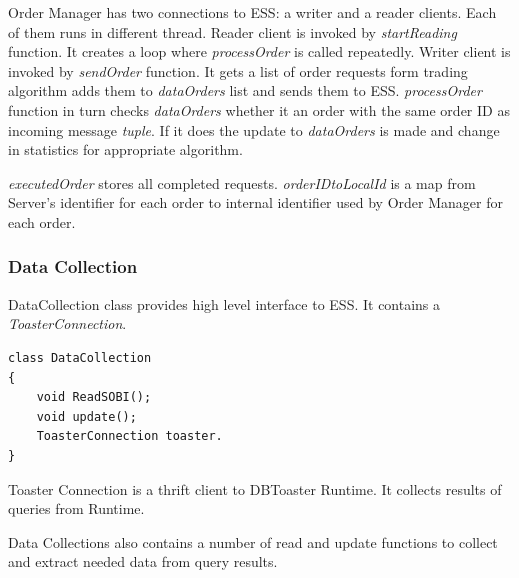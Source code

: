 \documentclass[14pt]{article}
\begin{document}
Order Manager has two connections to ESS: a writer and a reader clients. Each of them runs in different thread. Reader client is invoked by \emph{startReading} function. It creates a loop where \emph{processOrder} is called repeatedly. Writer client is invoked by \emph{sendOrder} function. It gets a list of order requests form trading algorithm adds them to \emph{dataOrders} list and sends them to ESS. \emph{processOrder} function in turn checks \emph{dataOrders} whether it an order with the same order ID as incoming message \emph{tuple}. If it does the update to \emph{dataOrders} is made and change in statistics for appropriate algorithm.

\emph{executedOrder} stores all completed requests. \emph{orderIDtoLocalId} is a map from Server's identifier for each order to internal identifier used by Order Manager for each order.


\subsubsection{Data Collection}
DataCollection class provides high level interface to ESS. It contains a \emph{ToasterConnection}. 

\begin{verbatim}
class DataCollection
{
    void ReadSOBI();
    void update();
    ToasterConnection toaster.
}
\end{verbatim}

Toaster Connection is a thrift client to DBToaster Runtime. It collects results of queries from Runtime. 

Data Collections also contains a number of read and update functions to collect and extract needed data from query results.



\end{document}
